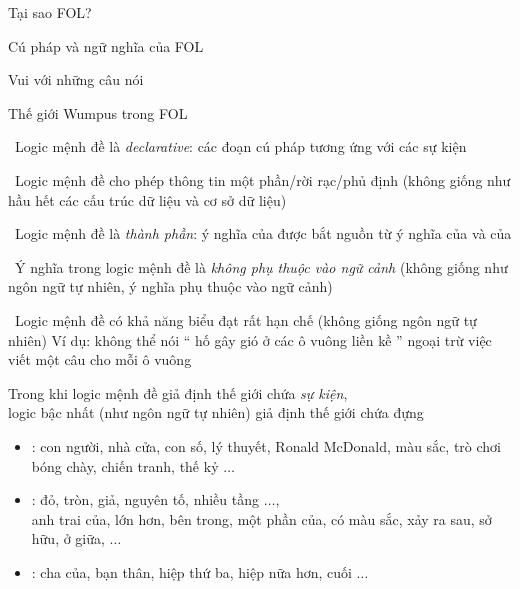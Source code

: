 \documentclass{article}
\begin{document}
\begin{huge}

\sf


\blob Tại sao FOL?

\blob Cú pháp và ngữ nghĩa của FOL

\blob Vui với những câu nói

\blob Thế giới Wumpus trong FOL



\smiley\ Logic mệnh đề là \emph{declarative}: các đoạn cú pháp tương ứng với các sự kiện

\smiley\ Logic mệnh đề cho phép thông tin một phần/rời rạc/phủ định \al
  (không giống như hầu hết các cấu trúc dữ liệu và cơ sở dữ liệu)

\smiley\ Logic mệnh đề là \emph{thành phần}: \al
  ý nghĩa của  được bắt nguồn từ ý nghĩa của  và của 

\smiley\ Ý nghĩa trong logic mệnh đề là \emph{không phụ thuộc vào ngữ cảnh}\al
  (không giống như ngôn ngữ tự nhiên, ý nghĩa phụ thuộc vào ngữ cảnh)

\frowny\ Logic mệnh đề có khả năng biểu đạt rất hạn chế\al
  (không giống ngôn ngữ tự nhiên)\al
  Ví dụ: không thể nói `` hố gây gió ở các ô vuông liền kề ''\nl
    ngoại trừ việc viết một câu cho mỗi ô vuông


Trong khi logic mệnh đề giả định thế giới chứa \emph{sự kiện},\\
logic bậc nhất (như ngôn ngữ tự nhiên) giả định thế giới chứa đựng
\begin{itemize} 
\item {}: con người, nhà cửa, con số, lý thuyết,
Ronald McDonald, màu sắc, trò chơi bóng chày, chiến tranh, thế kỷ $\ldots$ 
\item {}: đỏ, tròn, giả, nguyên tố, nhiều tầng $\ldots$, \\
anh trai của, lớn hơn, bên trong, một phần của, có màu sắc, xảy ra sau, sở hữu, ở giữa, $\ldots$
\item {}: cha của, bạn thân, hiệp thứ ba, hiệp nữa
hơn, cuối $\ldots$
\end{itemize}


\end{huge}
\end{document}
